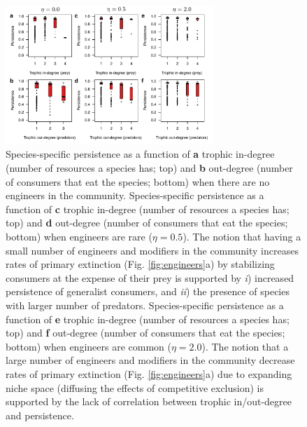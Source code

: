 \documentclass[twocolumn,preprintnumbers,amsmath,amssymb,superscriptaddress,linenumbers]{revtex4-1}
\begin{document}
\begin{figure}[h!]
\centering
\includegraphics[width=0.7\textwidth]{fig_indeng_combined.pdf}
\caption{
Species-specific persistence as a function of \textbf{a} trophic in-degree (number of resources a species has; top) and \textbf{b} out-degree (number of consumers that eat the species; bottom) when there are no engineers in the community. 
Species-specific persistence as a function of \textbf{c} trophic in-degree (number of resources a species has; top) and \textbf{d} out-degree (number of consumers that eat the species; bottom) when engineers are rare ($\eta = 0.5$).
The notion that having a small number of engineers and modifiers in the community increases rates of primary extinction (Fig. \ref{fig:engineers}a) by stabilizing consumers at the expense of their prey is supported by \emph{i}) increased persistence of generalist consumers, and \emph{ii}) the presence of species with larger number of predators.
Species-specific persistence as a function of \textbf{e} trophic in-degree (number of resources a species has; top) and \textbf{f} out-degree (number of consumers that eat the species; bottom) when engineers are common ($\eta = 2.0$).
The notion that a large number of engineers and modifiers in the community decrease rates of primary extinction (Fig. \ref{fig:engineers}a) due to expanding niche space (diffusing the effects of competitive exclusion) is supported by the lack of correlation between trophic in/out-degree and persistence.
}
\label{fig:indeng}
\end{figure}
\end{document}
